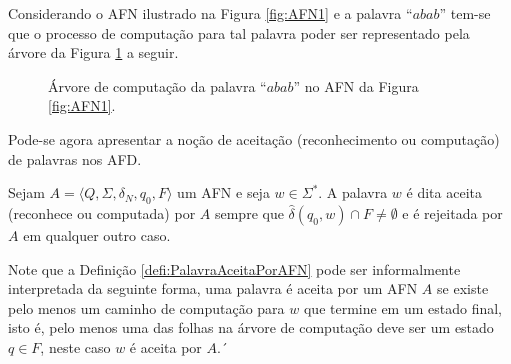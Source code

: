 \begin{example}\label{exe:ArvoreComputacaoAFN}
	Considerando o AFN ilustrado na Figura \ref{fig:AFN1} e a palavra ``$abab$'' tem-se que o processo de computação para tal palavra poder ser representado pela árvore da Figura \ref{fig:ArvoreComputacaoAFN} a seguir.
	
	\begin{figure}[h]
		\centering
		\caption{Árvore de computação da palavra ``$abab$'' no AFN da Figura \ref{fig:AFN1}.}
		\label{fig:ArvoreComputacaoAFN}
	\end{figure}
\end{example}

Pode-se agora apresentar a noção de aceitação (reconhecimento ou computação) de palavras nos AFD.

\begin{definition}\label{defi:PalavraAceitaPorAFN}
	Sejam $A = \langle Q, \Sigma, \delta_N, q_0, F\rangle$ um AFN e seja $w \in \Sigma^*$. A palavra $w$ é dita aceita (reconhece ou computada) por $A$ sempre que $\widehat{\delta}(q_0, w) \cap F \neq \emptyset$ e é rejeitada por $A$ em qualquer outro caso.
\end{definition}

Note que a Definição \ref{defi:PalavraAceitaPorAFN} pode ser informalmente interpretada da seguinte forma, uma palavra é aceita por um AFN $A$ se existe pelo menos um caminho de computação para $w$ que termine em um estado final, isto é, pelo menos uma das folhas na árvore de computação deve ser um estado $q \in F$, neste caso $w$ é aceita por $A$.´

